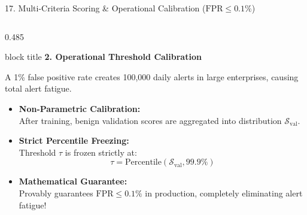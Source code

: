 \documentclass[aspectratio=169,10pt]{beamer}
\begin{document}
\begin{frame}[t]{17. Multi-Criteria Scoring \& Operational Calibration ($\text{FPR} \le 0.1\%$)}
\begin{columns}[T]
\begin{column}{0.485\textwidth}
\begin{beamercolorbox}[rounded=true,shadow=false,sep=0.28em,wd=\linewidth]{block title}
\textbf{\scriptsize 2. Operational Threshold Calibration}
\end{beamercolorbox}
\vspace{0.08em}
{\fontsize{6.8pt}{9.2pt}\selectfont
A 1\% false positive rate creates 100,000 daily alerts in large enterprises, causing total alert fatigue.
\begin{itemize}\itemsep0.18em
  \item \textbf{Non-Parametric Calibration:}\\
  After training, benign validation scores are aggregated into distribution $\mathcal{S}_{\text{val}}$.
  \item \textbf{Strict Percentile Freezing:}\\
  Threshold $\tau$ is frozen strictly at:
  \[
  \tau = \text{Percentile}(\mathcal{S}_{\text{val}}, 99.9\%)
  \]
  \item \textbf{Mathematical Guarantee:}\\
  Provably guarantees $\text{FPR} \le 0.1\%$ in production, completely eliminating alert fatigue!
\end{itemize}
}
\end{column}
\end{columns}
\end{frame}
\end{document}
